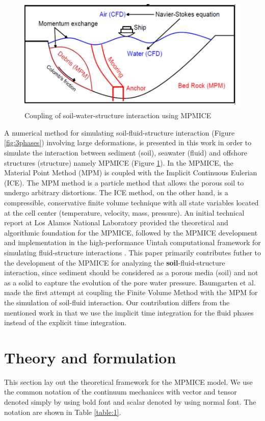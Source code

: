 \documentclass[preprint,12pt]{elsarticle}
\begin{document}
%
%
\begin{figure}[h]
\center
\includegraphics[scale=.4]{MPMICE.jpg}
\caption{Coupling of soil-water-structure interaction using MPMICE}
\label{fig:MPMICE}
\end{figure}
%
%

A numerical method for simulating soil-fluid-structure interaction (Figure \ref{fig:3phases}) involving large deformations, is presented in this work in order to simulate the interaction between sediment (soil), seawater (fluid) and offshore structures (structure) namely MPMICE (Figure \ref{fig:MPMICE}). In the MPMICE, the Material Point Method (MPM) is coupled with the Implicit Continuous Eulerian (ICE). The MPM method is a particle method that allows the porous soil to undergo arbitrary distortions. The ICE method, on the other hand, is a compressible, conservative finite volume technique with all state variables located at the cell center (temperature, velocity, mass, pressure). An initial technical report \cite{Kashiwa} at Los Alamos National Laboratory provided the theoretical and algorithmic foundation for the MPMICE, followed by the MPMICE development and implementation in the high-performance Uintah computational framework for simulating fluid-structure interactions \cite{MPMICE}. This paper primarily contributes futher to the development of the MPMICE for analyzing the \textbf{soil}-fluid-structure interaction, since sediment should be considered as a porous media (soil) and not as a solid to capture the evolution of the pore water pressure. Baumgarten et al. \cite{Baumgarten2021} made the first attempt at coupling the Finite Volume Method with the MPM for the simulation of soil-fluid interaction. Our contribution differs from the mentioned work in that we use the implicit time integration for the fluid phases instead of the explicit time integration.

\section{\textsf{Theory and formulation}}
This section lay out the theoretical framework for the MPMICE model. We use the common notation of the continuum mechaniccs with vector and tensor denoted simply by using bold font and scalar denoted by using normal font. The notation
are shown in Table \ref{table:1}.
\end{document}
